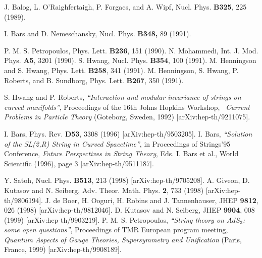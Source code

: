 \documentclass[a4paper,12pt]{article}
\begin{document}
\begin{thebibliography}{99}
  J. Balog, L. O'Raighfertaigh, P. Forgacs, and A. Wipf, Nucl.
Phys. \textbf{B325}, 225 (1989).

  I. Bars and D. Nemeschansky, Nucl. Phys. \textbf{B348,} 89
(1991).

  P. M. S. Petropoulos, Phys. Lett. \textbf{B236}, 151
(1990). \newline
N. Mohammedi, Int. J. Mod. Phys. \textbf{A5}, 3201 (1990). \newline
S. Hwang, Nucl. Phys. \textbf{B354}, 100 (1991). \newline
M. Henningson and S. Hwang, Phys. Lett. \textbf{B258}, 341 (1991). \newline
M. Henningson, S. Hwang, P. Roberts, and B. Sundborg, Phys. Lett. \textbf{%
B267}, 350 (1991).

  S. Hwang and P. Roberts, \textit{``Interaction and
modular invariance of strings on curved manifolds''}, Proceedings of the
16th Johns Hopkins Workshop, \textit{\ Current Problems in Particle Theory}
(Goteborg, Sweden, 1992) [arXiv:hep-th/9211075].

  I. Bars, Phys. Rev. \textbf{D53}, 3308 (1996)
[arXiv:hep-th/9503205]. \newline
I. Bars, \textit{``Solution of the SL(2,R) String in Curved Spacetime''}, in
Proceedings of Strings'95 Conference, \textit{Future Perspectives in String
Theory}, Eds. I. Bars et al., World Scientific (1996), page 3
[arXiv:hep-th/9511187].

  Y. Satoh, Nucl. Phys. \textbf{B513}, 213 (1998)
[arXiv:hep-th/9705208]. \newline
A. Giveon, D. Kutasov and N. Seiberg,
Adv. Theor. Math. Phys. \textbf{2}, 733 (1998) [arXiv:hep-th/9806194].
\newline
J. de Boer, H. Ooguri, H. Robins and J. Tannenhauser,
JHEP \textbf{9812}, 026 (1998) [arXiv:hep-th/9812046]. \newline
D. Kutasov and N. Seiberg, %
JHEP \textbf{9904}, 008 (1999) [arXiv:hep-th/9903219]. \newline
P. M. S. Petropoulos, \textit{``String theory on $AdS_{3}$: some open
questions''}, Proceedings of TMR European program meeting, \textit{Quantum
Aspects of Gauge Theories, Supersymmetry and Unification} (Paris, France,
1999) [arXiv:hep-th/9908189].


\end{thebibliography}
\end{document}

